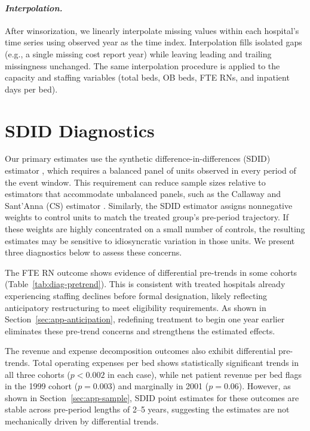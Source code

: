 \documentclass[a4paper, 12pt]{article}
\begin{document}
\paragraph{\textit{Interpolation.}} After winsorization, we linearly interpolate missing values within each hospital's time series using observed year as the time index. Interpolation fills isolated gaps (e.g., a single missing cost report year) while leaving leading and trailing missingness unchanged. The same interpolation procedure is applied to the capacity and staffing variables (total beds, OB beds, FTE RNs, and inpatient days per bed).



\section{SDID Diagnostics}
\label{sec:app-diagnostics}

Our primary estimates use the synthetic difference-in-differences (SDID) estimator \citep{arkhangelsky2021}, which requires a balanced panel of units observed in every period of the event window. This requirement can reduce sample sizes relative to estimators that accommodate unbalanced panels, such as the Callaway and Sant'Anna (CS) estimator \citep{callaway2021}. Similarly, the SDID estimator assigns nonnegative weights to control units to match the treated group's pre-period trajectory. If these weights are highly concentrated on a small number of controls, the resulting estimates may be sensitive to idiosyncratic variation in those units. We present three diagnostics below to assess these concerns.

The FTE RN outcome shows evidence of differential pre-trends in some cohorts (Table~\ref{tab:diag-pretrend}). This is consistent with treated hospitals already experiencing staffing declines before formal designation, likely reflecting anticipatory restructuring to meet eligibility requirements. As shown in Section~\ref{sec:app-anticipation}, redefining treatment to begin one year earlier eliminates these pre-trend concerns and strengthens the estimated effects.

The revenue and expense decomposition outcomes also exhibit differential pre-trends. Total operating expenses per bed shows statistically significant trends in all three cohorts ($p < 0.002$ in each case), while net patient revenue per bed flags in the 1999 cohort ($p = 0.003$) and marginally in 2001 ($p = 0.06$). However, as shown in Section~\ref{sec:app-sample}, SDID point estimates for these outcomes are stable across pre-period lengths of 2--5 years, suggesting the estimates are not mechanically driven by differential trends.
\end{document}
